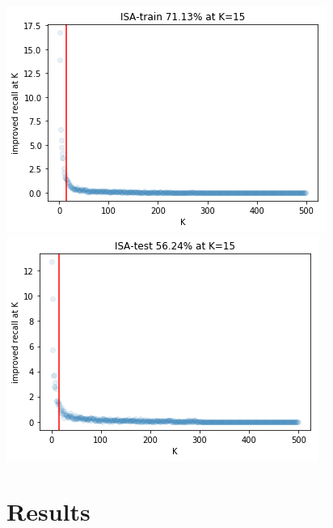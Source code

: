 \documentclass{article}
\begin{document}
\begin{multicols}{2}
\includegraphics[width=\columnwidth]{../images/recall-train-isa.png}
\includegraphics[width=\columnwidth]{../images/recall-test-isa.png}




\section{Results}


\end{multicols}
\end{document}
